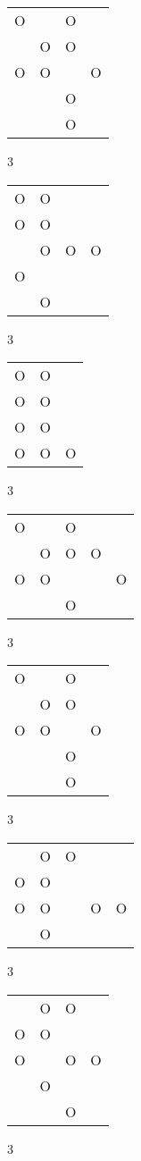 \begin{tabular}{|m{0.2cm}m{0.2cm}m{0.2cm}m{0.2cm}|}\hline
O& &O& \\
 &O&O& \\
O&O& &O\\
 & &O& \\
 & &O& \\
\hline\end{tabular}3
\begin{tabular}{|m{0.2cm}m{0.2cm}m{0.2cm}m{0.2cm}|}\hline
O&O& & \\
O&O& & \\
 &O&O&O\\
O& & & \\
 &O& & \\
\hline\end{tabular}3
\begin{tabular}{|m{0.2cm}m{0.2cm}m{0.2cm}|}\hline
O&O& \\
O&O& \\
O&O& \\
O&O&O\\
\hline\end{tabular}3
\begin{tabular}{|m{0.2cm}m{0.2cm}m{0.2cm}m{0.2cm}m{0.2cm}|}\hline
O& &O& & \\
 &O&O&O& \\
O&O& & &O\\
 & &O& & \\
\hline\end{tabular}3
\begin{tabular}{|m{0.2cm}m{0.2cm}m{0.2cm}m{0.2cm}|}\hline
O& &O& \\
 &O&O& \\
O&O& &O\\
 & &O& \\
 & &O& \\
\hline\end{tabular}3
\begin{tabular}{|m{0.2cm}m{0.2cm}m{0.2cm}m{0.2cm}m{0.2cm}|}\hline
 &O&O& & \\
O&O& & & \\
O&O& &O&O\\
 &O& & & \\
\hline\end{tabular}3
\begin{tabular}{|m{0.2cm}m{0.2cm}m{0.2cm}m{0.2cm}|}\hline
 &O&O& \\
O&O& & \\
O& &O&O\\
 &O& & \\
 & &O& \\
\hline\end{tabular}3
